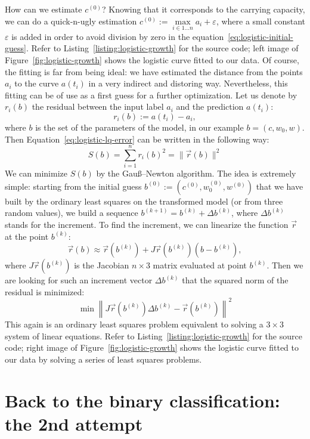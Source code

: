 \documentclass[notitlepage,oneside]{book}
\begin{document}
How can we estimate $c^{(0)}$? Knowing that it corresponds to the carrying capacity, we can do a quick-n-ugly estimation $c^{(0)}:=\max\limits_{i\in 1\dots n} a_i + \varepsilon$, where a small constant $\varepsilon$ is added in order to avoid division by
zero in the equation~\eqref{eq:logistic-initial-guess}.
Refer to Listing~\ref{listing:logistic-growth} for the source code; left image of Figure~\ref{fig:logistic-growth} shows the logistic curve fitted to our data.
Of course, the fitting is far from being ideal: we have estimated the distance from the points $a_i$ to the curve $a(t_i)$ in a very indirect and distoring way.
Nevertheless, this fitting can be of use as a first guess for a further optimization.
Let us denote by $r_i(b)$ the residual between the input label $a_i$ and the prediction $a(t_i)$:
$$r_i(b) := a(t_i) - a_i,$$
where $b$ is the set of the parameters of the model, in our example $b=(c, w_0, w)$.
Then Equation~\eqref{eq:logistic-lq-error} can be written in the following way:
\begin{equation}
\label{eq:logistic-lq-error2}
S(b) = \sum\limits_{i=1}^n r_i(b)^2 = \|\vec{r}(b)\|^2
\end{equation}
We can minimize $S(b)$ by the Gauß–Newton algorithm.
The idea is extremely simple: starting from the initial guess 
$b^{(0)} := \left(c^{(0)}, w_0^{(0)}, w^{(0)}\right)$
that we have built by the ordinary least squares on the transformed model (or from three random values),
we build a sequence $b^{(k+1)} = b^{(k)} + \Delta b^{(k)}$,
where $\Delta b^{(k)}$ stands for the increment.%
To find the increment, we can linearize the function $\vec{r}$ at the point $b^{(k)}$:
$$
\vec{r}(b) \approx \vec{r}\left(b^{(k)}\right) + J\vec{r}\left(b^{(k)}\right) \left(b - b^{(k)}\right),
$$
where $J\vec{r}\left(b^{(k)}\right)$ is the Jacobian $n\times 3$ matrix evaluated at point $b^{(k)}$.
Then we are looking for such an increment vector $ \Delta b^{(k)}$ that the squared norm of the residual is minimized:
$$
\min \left\| J\vec{r}\left(b^{(k)}\right) \Delta b^{(k)} - \vec{r}\left(b^{(k)}\right) \right\|^2
$$
This again is an ordinary least squares problem equivalent to solving a $3\times 3$ system of linear equations.
Refer to Listing~\ref{listing:logistic-growth} for the source code; right image of Figure~\ref{fig:logistic-growth} shows the logistic curve fitted to our data
by solving a series of least squares problems.


\section{Back to the binary classification: the 2nd attempt}
\label{sec:logistic1d}
\end{document}
